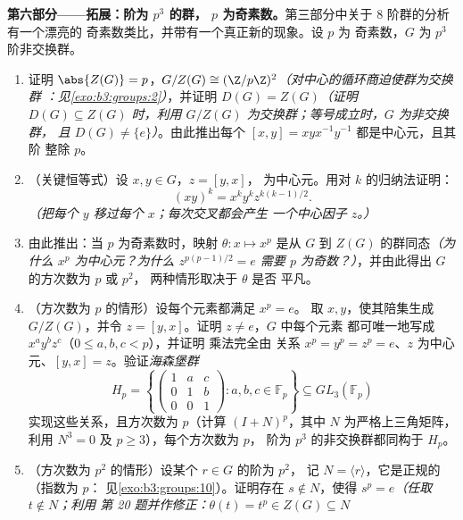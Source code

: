 \begin{problem}
\medskip
\noindent\textbf{第六部分——拓展：阶为 $p^3$ 的群，
$p$ 为奇素数。}第三部分中关于 $8$ 阶群的分析有一个漂亮的
奇素数类比，并带有一个真正新的现象。设 $p$ 为
奇素数，$G$ 为 $p^3$ 阶非交换群。
\begin{enumerate}[resume]
  \item 证明 $\abs{Z(G)} = p$，$G/Z(G) \cong
        (\Z/p\Z)^2$\emph{（对中心的循环商迫使群为交换群
        ：见\cref{exo:b3:groups:2}）}，并证明 $D(G) =
        Z(G)$\emph{（证明 $D(G) \subseteq Z(G)$ 时，利用
        $G/Z(G)$ 为交换群；等号成立时，$G$ 为非交换群，
        且 $D(G) \neq \{e\}$）}。由此推出每个
        $[x, y] = xyx^{-1}y^{-1}$ 都是中心元，且其阶
        整除 $p$。
  \item （关键恒等式）设 $x, y \in G$，$z = [y, x]$，
        为中心元。用对 $k$ 的归纳法证明：
        \[
        (xy)^k = x^k y^k z^{k(k-1)/2} .
        \]
        \emph{（把每个 $y$ 移过每个 $x$；每次交叉都会产生
        一个中心因子 $z$。）}
  \item 由此推出：当 $p$ 为奇素数时，映射 $\theta\colon x \mapsto
        x^p$ 是从 $G$ 到 $Z(G)$ 的群同态\emph{（为什么
        $x^p$ 为中心元？为什么 $z^{p(p-1)/2} = e$ 需要 $p$
        为奇数？）}，并由此得出 $G$ 的方次数为 $p$ 或 $p^2$，
        两种情形取决于 $\theta$ 是否
        平凡。
  \item （方次数为 $p$ 的情形）设每个元素都满足 $x^p = e$。
        取 $x, y$，使其陪集生成 $G/Z(G)$，并令 $z =
        [y, x]$。证明 $z \neq e$，$G$ 中每个元素
        都可唯一地写成 $x^ay^bz^c$（$0 \leq a, b, c < p$），并证明
        乘法完全由
        关系 $x^p = y^p = z^p = e$、$z$ 为中心元、$[y, x] =
        z$。验证\emph{海森堡群}
        \[
        H_p = \left\{
        \begin{pmatrix} 1 & a & c\\ 0 & 1 & b\\ 0 & 0 & 1
        \end{pmatrix} : a, b, c \in \mathbb F_p \right\}
        \subseteq GL_3(\mathbb F_p)
        \]
        实现这些关系，且方次数为 $p$（计算
        $(I + N)^p$，其中 $N$ 为严格上三角矩阵，利用
        $N^3 = 0$ 及 $p \geq 3$），每个方次数为 $p$，
        阶为 $p^3$ 的非交换群都同构于 $H_p$。
  \item （方次数为 $p^2$ 的情形）设某个 $r \in G$ 的阶为 $p^2$，
        记 $N = \langle r\rangle$，它是正规的（指数为 $p$：
        见\cref{exo:b3:groups:10}）。证明存在 $s \notin N$，使得
        $s^p = e$\emph{（任取 $t \notin N$；利用
        第 20 题并作修正：$\theta(t) = t^p \in Z(G) \subseteq N$
}
\end{enumerate}
\end{problem}
